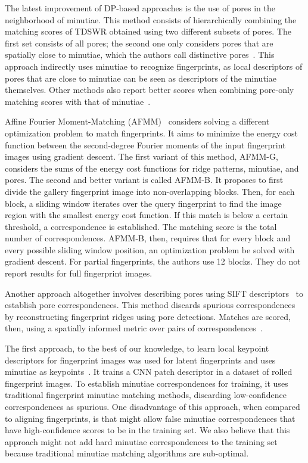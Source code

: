\documentclass[10pt,twocolumn,letterpaper]{article}
\begin{document}
The latest improvement of DP-based approaches is the use of pores in the neighborhood of minutiae.
This method consists of hierarchically combining the matching scores of TDSWR obtained using two different subsets of pores.
The first set consists of all pores; the second one only considers pores that are spatially close to minutiae, which the authors call distinctive pores~\cite{feature-guided}.
This approach indirectly uses minutiae to recognize fingerprints, as local descriptors of pores that are close to minutiae can be seen as descriptors of the minutiae themselves.
Other methods also report better scores when combining pore-only matching scores with that of minutiae~\cite{direct-pore, td-sparse}.

Affine Fourier Moment-Matching (AFMM)~\cite{su-pores-deep} considers solving a different optimization problem to match fingerprints.
It aims to minimize the energy cost function between the second-degree Fourier moments of the input fingerprint images using gradient descent.
The first variant of this method, AFMM-G, considers the sums of the energy cost functions for ridge patterns, minutiae, and pores.
The second and better variant is called AFMM-B.
It proposes to first divide the gallery fingerprint image into non-overlapping blocks.
Then, for each block, a sliding window iterates over the query fingerprint to find the image region with the smallest energy cost function.
If this match is below a certain threshold, a correspondence is established.
The matching score is the total number of correspondences.
AFMM-B, then, requires that for every block and every possible sliding window position, an optimization problem be solved with gradient descent.
For partial fingerprints, the authors use 12 blocks.
They do not report results for full fingerprint images.

Another approach altogether involves describing pores using SIFT descriptors~\cite{sift} to establish pore correspondences.
This method discards spurious correspondences by reconstructing fingerprint ridges using pore detections.
Matches are scored, then, using a spatially informed metric over pairs of correspondences~\cite{ridge-reconstruction}.

The first approach, to the best of our knowledge, to learn local keypoint descriptors for fingerprint images was used for latent fingerprints and uses minutiae as keypoints~\cite{jain-latent}.
It trains a CNN patch descriptor in a dataset of rolled fingerprint images. 
To establish minutiae correspondences for training, it uses traditional fingerprint minutiae matching methods, discarding low-confidence correspondences as spurious.
One disadvantage of this approach, when compared to aligning fingerprints, is that might allow false minutiae correspondences that have high-confidence scores to be in the training set.
We also believe that this approach might not add hard minutiae correspondences to the training set because traditional minutiae matching algorithms are sub-optimal. %
\end{document}
